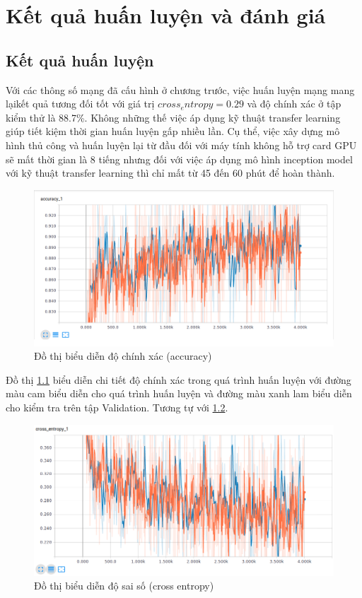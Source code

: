 \chapter{Kết quả huấn luyện và đánh giá}
\section{Kết quả huấn luyện}
Với các thông số mạng đã cấu hình ở chương trước, việc huấn luyện mạng mang lạikết quả tương đối tốt với giá trị \(cross_entropy = 0.29\) và độ chính xác ở tập kiểm thử là 88.7\%. Không những thế việc áp dụng kỹ thuật transfer learning giúp tiết kiệm thời gian huấn luyện gấp nhiều lần. Cụ thể, việc xây dựng mô hình thủ công và huấn luyện lại từ đầu đối với máy tính không hỗ trợ card GPU sẽ mất thời gian là 8 tiếng nhưng đối với việc áp dụng mô hình inception model với kỹ thuật transfer learning thì chỉ mất từ 45 đến 60 phút để hoàn thành.\par

	\begin{figure}[h!]
		\centering
		\includegraphics[scale=0.5]{charts/accuracy.png}
		\caption{Đồ thị biểu diễn độ chính xác (accuracy)}
		\label{fig:accuracy}
	\end{figure}

Đồ thị \ref{fig:accuracy} biểu diễn chi tiết độ chính xác trong quá trình huấn luyện với đường màu cam biểu diễn cho quá trình huấn luyện và đường màu xanh lam biểu diễn cho kiểm tra trên tập Validation. Tương tự với \ref{fig:cross_entropy}.

	\begin{figure}[h!]
		\centering
		\includegraphics[scale=0.5]{charts/cross-entropy.png}
		\caption{Đồ thị biểu diễn độ sai số (cross entropy)}
		\label{fig:cross_entropy}
	\end{figure}

